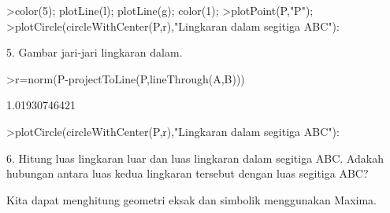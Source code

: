 \documentclass[a4paper,10pt]{article}
\begin{document}
\begin{eulernotebook}
\begin{eulercomment}
\begin{eulercomment}
\begin{eulercomment}
\begin{eulercomment}
\begin{eulercomment}
\begin{eulercomment}
\begin{eulercomment}
\begin{eulercomment}
\begin{eulercomment}
\begin{eulercomment}
\begin{eulercomment}
\begin{eulercomment}
\begin{eulercomment}
\begin{eulercomment}
\begin{eulercomment}
\begin{eulercomment}
\begin{eulercomment}
\begin{eulercomment}
\begin{eulercomment}
\begin{eulercomment}
\begin{eulercomment}
\begin{eulercomment}
\begin{eulercomment}
\begin{eulercomment}
\begin{eulercomment}
\begin{eulercomment}
\begin{eulercomment}
\begin{eulercomment}
\begin{eulercomment}
\begin{eulercomment}
\begin{euleroutput}
\end{euleroutput}
\begin{eulerprompt}
>color(5); plotLine(l); plotLine(g); color(1);
>plotPoint(P,"P");
>plotCircle(circleWithCenter(P,r),"Lingkaran dalam segitiga ABC"):
\end{eulerprompt}
\begin{eulercomment}
5. Gambar jari-jari lingkaran dalam.
\end{eulercomment}
\begin{eulerprompt}
>r=norm(P-projectToLine(P,lineThrough(A,B)))
\end{eulerprompt}
\begin{euleroutput}
  1.01930746421
\end{euleroutput}
\begin{eulerprompt}
>plotCircle(circleWithCenter(P,r),"Lingkaran dalam segitiga ABC"):
\end{eulerprompt}
\begin{eulercomment}
6. Hitung luas lingkaran luar dan luas lingkaran dalam segitiga ABC.
Adakah hubungan antara luas kedua lingkaran tersebut dengan luas
segitiga ABC?
\end{eulercomment}
\begin{eulercomment}
Kita dapat menghitung geometri eksak dan simbolik menggunakan Maxima.


\end{eulercomment}
\end{eulercomment}
\end{eulercomment}
\end{eulercomment}
\end{eulercomment}
\end{eulercomment}
\end{eulercomment}
\end{eulercomment}
\end{eulercomment}
\end{eulercomment}
\end{eulercomment}
\end{eulercomment}
\end{eulercomment}
\end{eulercomment}
\end{eulercomment}
\end{eulercomment}
\end{eulercomment}
\end{eulercomment}
\end{eulercomment}
\end{eulercomment}
\end{eulercomment}
\end{eulercomment}
\end{eulercomment}
\end{eulercomment}
\end{eulercomment}
\end{eulercomment}
\end{eulercomment}
\end{eulercomment}
\end{eulercomment}
\end{eulercomment}
\end{eulercomment}
\end{eulernotebook}
\end{document}
